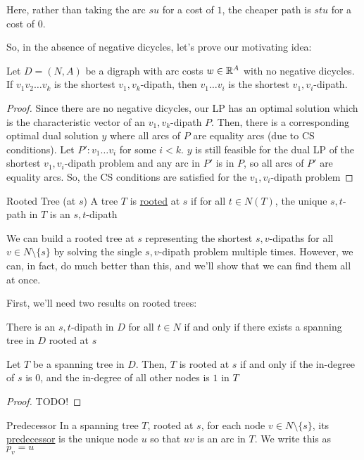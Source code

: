 Here, rather than taking the arc $su$ for a cost of $1$, the cheaper path is $stu$ for a cost of $0$.

So, in the absence of negative dicycles, let's prove our motivating idea:
\begin{theorem}{}{}
    Let $D = (N, A)$ be a digraph with arc costs $w \in \mathbb{R}^A$ with no negative dicycles. 
    If $v_1v_2\ldots v_k$ is the shortest $v_1,v_k$-dipath, then $v_1\ldots v_i$ is the shortest $v_1,v_i$-dipath.
\end{theorem}
\begin{proof}
    Since there are no negative dicycles, our LP has an optimal solution which is the characteristic vector of an $v_1,v_k$-dipath $P$.
    Then, there is a corresponding optimal dual solution $y$ where all arcs of $P$ are equality arcs (due to CS conditions).
    Let $P': v_1\ldots v_i$ for some $i<k$.
    $y$ is still feasible for the dual LP of the shortest $v_1,v_i$-dipath problem and any arc in $P'$ is in $P$, so all arcs of $P'$ are equality arcs.
    So, the CS conditions are satisfied for the $v_1,v_i$-dipath problem
\end{proof}
\begin{definition}{Rooted Tree (at $s$)}{}
    A tree $T$ is \underline{rooted} at $s$ if for all $t \in N(T)$, the unique $s,t$-path in $T$ is an $s,t$-dipath
\end{definition}
We can build a rooted tree at $s$ representing the shortest $s,v$-dipaths for all $v \in N\setminus\{s\}$ by solving the single $s,v$-dipath problem multiple times.
However, we can, in fact, do much better than this, and we'll show that we can find them all at once.

First, we'll need two results on rooted trees:
\begin{proposition}{}{}
    There is an $s,t$-dipath in $D$ for all $t \in N$ if and only if there exists a spanning tree in $D$ rooted at $s$
\end{proposition}
\begin{proposition}{}{}
    Let $T$ be a spanning tree in $D$. Then, $T$ is rooted at $s$ if and only if the in-degree of $s$ is $0$, and the in-degree of all other nodes is $1$ in $T$
\end{proposition}
\begin{proof}
    TODO!
\end{proof}

\begin{definition}{Predecessor}{}
    In a spanning tree $T$, rooted at $s$, for each node $v \in N\setminus\{s\}$, its \underline{predecessor} is the unique node $u$ so that $uv$ is an arc in $T$. We write this as $p_v = u$
\end{definition}

